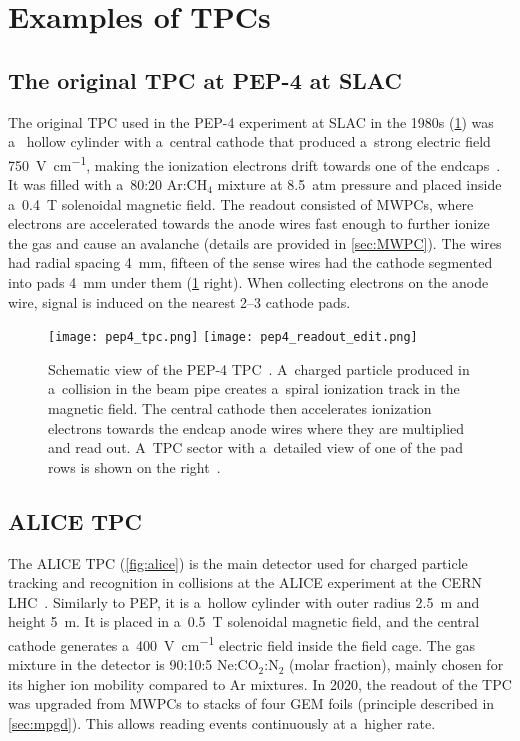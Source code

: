 	\section{Examples of TPCs}
		\subsection{The original TPC at PEP-4 at SLAC}
			The original \ac{TPC} used in the PEP-4 experiment at SLAC in the 1980s (\cref{fig:pep4}) was a~ hollow cylinder with a~central cathode that produced a~strong electric field \qty{750}{\V\per\cm}, making the ionization electrons drift towards one of the endcaps~\cite{pep4-2}. It was filled with a~80:20 Ar:CH$_4$ mixture at \qty{8.5}{atm} pressure and placed inside a~\qty{0.4}{\tesla} solenoidal magnetic field. The readout consisted of \acp{MWPC}, where electrons are accelerated towards the anode wires fast enough to further ionize the gas and cause an avalanche (details are provided in \cref{sec:MWPC}). The wires had radial spacing \qty{4}{\mm}, fifteen of the sense wires had the cathode segmented into  pads \qty{4}{\mm} under them (\cref{fig:pep4} right). When collecting electrons on the anode wire, signal is induced on the nearest \numrange{2}{3} cathode pads.
			
			\begin{figure}
				\centering
				\texttt{[image: pep4\_tpc.png]}
				\hfill
				\texttt{[image: pep4\_readout\_edit.png]}
				\caption{Schematic view of the PEP-4 \ac{TPC}~\cite{pep4}. A~charged particle produced in a~collision in the beam pipe creates a~spiral ionization track in the magnetic field. The central cathode then accelerates ionization electrons towards the endcap anode wires where they are multiplied and read out. A~\ac{TPC} sector with a~detailed view of one of the pad rows is shown on the right~\cite{pep4_readout}.}
				\label{fig:pep4}
			\end{figure}
		
		\subsection{ALICE TPC}
			The ALICE \ac{TPC} (\cref{fig:alice}) is the main detector used for charged particle tracking and recognition in collisions at the ALICE experiment at the CERN LHC~\cite{ALICE}. Similarly to PEP, it is a~hollow cylinder with outer radius \qty{2.5}{\m} and height \qty{5}{\m}. It is placed in a~\qty{0.5}{\tesla} solenoidal magnetic field, and the central cathode generates a~\qty{400}{\V\per\cm} electric field inside the field cage. The gas mixture in the detector is 90:10:5 Ne:CO$_2$:N$_2$ (molar fraction), mainly chosen for its higher ion mobility compared to Ar mixtures. In 2020, the readout of the \ac{TPC} was upgraded from \acp{MWPC} to stacks of four \ac{GEM} foils (principle described in \cref{sec:mpgd}). This allows reading events continuously at a~higher rate.
			
